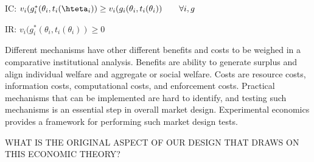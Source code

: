 \begin{center}
IC: 	$v_i(g^*_i(\theta_i,t_i(\hteta_i)) \geq v_i(g_i(\theta_i,t_i(\theta_i)) \qquad \forall i,g$

IR:	    $v_i(g^*_i(\theta_i,t_i(\theta_i)) \geq 0$
\end{center}

Different mechanisms have other different benefits and costs to be weighed in a comparative institutional analysis. Benefits are ability to generate surplus and align individual welfare and aggregate or social welfare. Costs are resource costs, information costs, computational costs, and enforcement costs. Practical mechanisms that can be implemented are hard to identify, and testing such mechanisms is an essential step in overall market design. Experimental economics provides a framework for performing such market design tests.

\cite{kiesling_2021}

WHAT IS THE ORIGINAL ASPECT OF OUR DESIGN THAT DRAWS ON THIS ECONOMIC THEORY?



